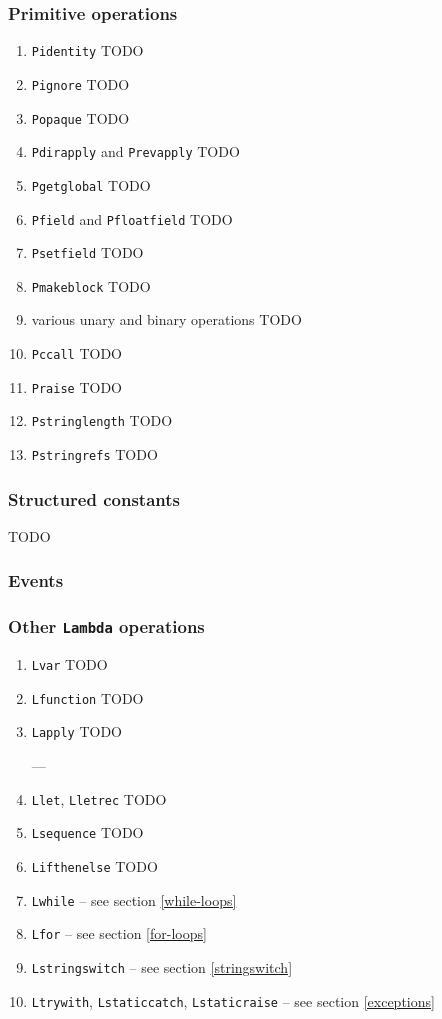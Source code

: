 \documentclass[12pt,a4paper,twoside,openright]{report}
\begin{document}
\subsubsection{Primitive operations}

\begin{enumerate}
  \item \lstinline!Pidentity! TODO
  \item \lstinline!Pignore! TODO
  \item \lstinline!Popaque! TODO
  \item \lstinline!Pdirapply! and \lstinline!Prevapply! TODO
  \item \lstinline!Pgetglobal! TODO
  \item \lstinline!Pfield! and \lstinline!Pfloatfield! TODO
  \item \lstinline!Psetfield! TODO
  \item \lstinline!Pmakeblock! TODO
  \item various unary and binary operations TODO
  \item \lstinline!Pccall! TODO
  \item \lstinline!Praise! TODO
  \item \lstinline!Pstringlength! TODO
  \item \lstinline!Pstringrefs! TODO
\end{enumerate}

\subsubsection{Structured constants}

TODO

\subsubsection{Events}

\subsubsection{Other \texttt{Lambda} operations}

\begin{enumerate}
  \item \lstinline!Lvar! TODO
  \item \lstinline!Lfunction! TODO
  \item \lstinline!Lapply! TODO

    ---

  \item \lstinline!Llet!, \lstinline!Lletrec! TODO
  \item \lstinline!Lsequence! TODO
  \item \lstinline!Lifthenelse! TODO
  \item \lstinline!Lwhile! -- see section \ref{while-loops}
  \item \lstinline!Lfor! -- see section \ref{for-loops}
  \item \lstinline!Lstringswitch! -- see section \ref{stringswitch}
  \item \lstinline!Ltrywith!, \lstinline!Lstaticcatch!, \lstinline!Lstaticraise! -- see section \ref{exceptions}
\end{enumerate}
\end{document}
